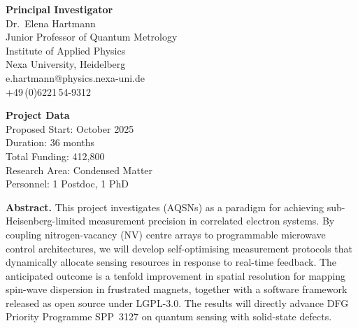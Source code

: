 \documentclass[11pt,a4paper]{article}
\begin{document}
\noindent
\begin{minipage}[t]{0.48\linewidth}
\begin{tcolorbox}[
  enhanced, sharp corners,
  colback=dfglightgray, colframe=dfgmidgray,
  top=4mm, bottom=4mm, left=5mm, right=5mm
]
{\small\color{dfgdarkgray}
\textbf{\color{dfgblue}Principal Investigator}\\[4pt]
Dr.\ Elena Hartmann\\
Junior Professor of Quantum Metrology\\
Institute of Applied Physics\\
Nexa University, Heidelberg\\[6pt]
\faEnvelope\; e.hartmann@physics.nexa-uni.de\\
\faPhone\; +49\,(0)6221\,54-9312}
\end{tcolorbox}
\end{minipage}%
\hfill
\begin{minipage}[t]{0.48\linewidth}
\begin{tcolorbox}[
  enhanced, sharp corners,
  colback=dfglightgray, colframe=dfgmidgray,
  top=4mm, bottom=4mm, left=5mm, right=5mm
]
{\small\color{dfgdarkgray}
\textbf{\color{dfgblue}Project Data}\\[4pt]
\faCalendar\; Proposed Start: October 2025\\[2pt]
\faClock\; Duration: 36 months\\[2pt]
\faEuroSign\; Total Funding: \EUR{}412,800\\[2pt]
\faFlask\; Research Area: Condensed Matter\\[2pt]
\faUsers\; Personnel: 1 Postdoc, 1 PhD}
\end{tcolorbox}
\end{minipage}

\vspace{10mm}

\noindent
\begin{tcolorbox}[
  enhanced, sharp corners,
  colback=white, colframe=dfgaccent,
  borderline west={3pt}{0pt}{dfggold},
  top=3mm, bottom=3mm, left=5mm, right=5mm
]
\textbf{\color{dfgblue}Abstract.}\quad
This project investigates  (AQSNs) as a
paradigm for achieving sub-Heisenberg-limited measurement precision in correlated
electron systems. By coupling nitrogen-vacancy (NV) centre arrays to programmable
microwave control architectures, we will develop self-optimising measurement protocols
that dynamically allocate sensing resources in response to real-time feedback. The
anticipated outcome is a tenfold improvement in spatial resolution for mapping spin-wave
dispersion in frustrated magnets, together with a software framework released as open
source under LGPL-3.0. The results will directly advance DFG Priority Programme SPP~3127
on quantum sensing with solid-state defects.
\end{tcolorbox}
\end{document}
